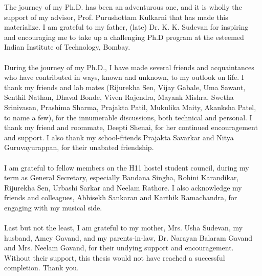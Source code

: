 The journey of my Ph.D. has been an adventurous one, and it is wholly the 
support of my advisor, Prof. Purushottam Kulkarni that has made this 
materialize. I am grateful to my father, (late) Dr. K. K. Sudevan for inspiring 
and encouraging me to take up a challenging Ph.D program at the esteemed
Indian Institute of Technology, Bombay. 
\\
\\
During the journey of my Ph.D., I have made several friends and 
acquaintances who have contributed in ways, known and unknown, 
to my outlook on life. 
I thank my friends and lab mates (Rijurekha Sen, Vijay Gabale,
Uma Sawant, Senthil Nathan, Dhaval Bonde, Viven Rajendra,
Mayank Mishra, Swetha Srinivasan, Prashima Sharma,
Prajakta Patil, Mukulika Maity, Akanksha Patel, to name a few),
for the innumerable discussions, both technical and personal.
I thank my friend and roommate, Deepti Shenai, for her continued
encouragement and support. I also thank my school-friends Prajakta
Savarkar and Nitya Guruvayurappan, for their unabated friendship.
\\
\\
I am grateful to fellow members on the H11 hostel student council,
during my term as General Secretary, especially Bandana Singha,
Rohini Karandikar, Rijurekha Sen, Urbashi Sarkar and Neelam Rathore.
I also acknowledge my friends and
colleagues, Abhisekh Sankaran and Karthik Ramachandra, for
engaging with my musical side.
\\
\\
Last but not the least, I am grateful to my mother, Mrs. Usha Sudevan, 
my husband, Amey Gavand, and my
parents-in-law, Dr. Narayan Balaram Gavand and Mrs. Neelam Gavand,
for their undying support and encouragement. Without their support,
this thesis would not have reached a successful completion. Thank you.
